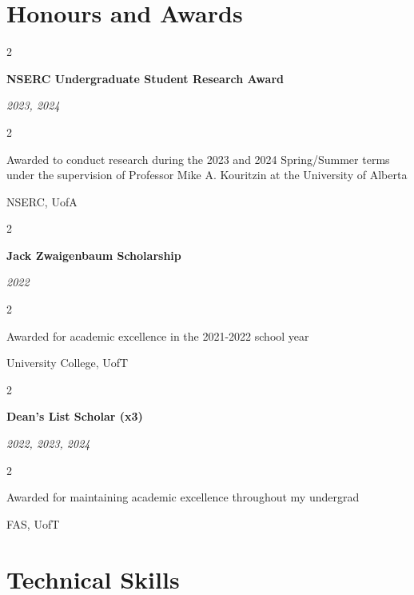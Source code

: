 \documentclass[10pt, letterpaper]{article}
\newenvironment{twocolentry}[2][]{
    \onecolentry
    \def\secondColumn{#2}
    \setcolumnwidth{\fill, 4.5 cm}
    \begin{paracol}{2}
}{
    \switchcolumn \raggedleft \secondColumn
    \end{paracol}
    \endonecolentry
} %
\begin{document}
     \vspace{0.2 cm}

    \section{Honours and Awards}





    \begin{twocolentry}{   
            
        \textit{2023, 2024}}
            \textbf{NSERC Undergraduate Student Research Award}
        \end{twocolentry}

        \vspace{0.10 cm}
    \begin{twocolentry}{      NSERC, UofA}
        Awarded to conduct research during the 2023 and 2024 Spring/Summer terms under the supervision of Professor Mike A. Kouritzin at the University of Alberta
    \end{twocolentry}

    \vspace{0.2cm}

    \begin{twocolentry}
       { \textit{2022}}
        \textbf{Jack Zwaigenbaum Scholarship}
    \end{twocolentry}
    \vspace{0.1cm}
    \begin{twocolentry}
        {University College, UofT}
        Awarded for academic excellence in the 2021-2022 school year
    \end{twocolentry}

    \vspace{0.2cm}
    \begin{twocolentry}{
        \textit{2022, 2023, 2024}
    }
        \textbf{Dean's List Scholar (x3)}
    \end{twocolentry}
    \vspace{0.1cm}
    \begin{twocolentry}
        {
            FAS, UofT
        }
        Awarded for maintaining academic excellence throughout my undergrad
    \end{twocolentry}

    \section{Technical Skills}
\end{document}
